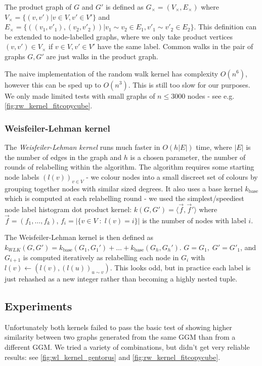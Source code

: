 The product graph of $G$ and  $G'$ is defined as $G_\times = (V_\times, E_\times)$ where $V_\times = \{(v, v') | v \in V, v' \in V'\}$ and $E_\times = \{((v_1, v'_1), (v_2, v'_2)) | v_1 \sim v_2 \in E_1, v'_1 \sim v'_2 \in E_2\}$. This definition can be extended to node-labelled graphs, where we only take product vertices $(v, v') \in V_\times$ if $v \in V, v' \in V'$ have the same label. Common walks in the pair of graphs $G,G'$ are just walks in the product graph.

The naive implementation of the random walk kernel has complexity $O(n^6)$, however this can be sped up to $O(n^3)$. This is still too slow for our purposes. We only made limited tests with small graphs of $n \leq 3000$ nodes - see e.g. \cref{fig:rw_kernel_fitcopycube}.

\subsubsection{Weisfeiler-Lehman kernel}
The \textit{Weisfeiler-Lehman kernel} runs much faster in $O(h|E|)$ time, where $|E|$ is the number of edges in the graph and $h$ is a chosen parameter, the number of rounds of relabelling within the algorithm. The algorithm requires some starting node labels $(l(v))_{v \in V}$ - we colour nodes into a small discreet set of colours by grouping together nodes with similar sized degrees. It also uses a base kernel $k_{\text{base}}$ which is computed at each relabelling round  - we used the simplest/speediest node label histogram dot product kernel: $k(G, G') = \langle \vec{f}, \vec{f}' \rangle$ where $\vec{f} = (f_1, \dots, f_k)$, $f_i = |\{ v \in V \;:\; l(v) = i\}|$ is the number of nodes with label $i$.

The Weisfeiler-Lehman kernel is then defined as $k_{WLK}(G, G') = k_{\text{base}}(G_1, G_1') + \dots + k_{\text{base}}(G_h, G_h')$. $G=G_1,\; G' = G'_1$, and $G_{i+1}$ is computed iteratively as relabelling each node in $G_i$ with $l(v) \gets (l(v), (l(u))_{u \sim v})$. This looks odd, but in practice each label is just rehashed as a new integer rather than becoming a highly nested tuple.



\subsection{Experiments}

Unfortunately both kernels failed to pass the basic test of showing higher similarity between two graphs generated from the same GGM than from a different GGM. We tried a variety of combinations, but didn't get very reliable results: see \cref{fig:wl_kernel_gentorus} and \cref{fig:rw_kernel_fitcopycube}.

